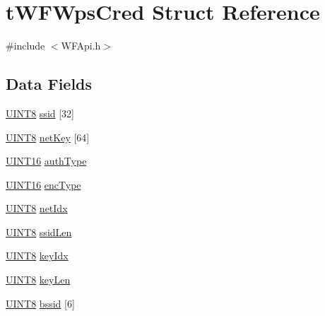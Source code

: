 \hypertarget{structt_w_f_wps_cred}{}\section{t\+W\+F\+Wps\+Cred Struct Reference}
\label{structt_w_f_wps_cred}


{\ttfamily \#include $<$W\+F\+Api.\+h$>$}

\subsection*{Data Fields}
\begin{DoxyCompactItemize}
\item 
\hyperlink{_generic_type_defs_8h_ab27e9918b538ce9d8ca692479b375b6a}{U\+I\+N\+T8} \hyperlink{structt_w_f_wps_cred_ad631765096072d8ec9f442288d4280d0}{ssid} \mbox{[}32\mbox{]}
\item 
\hyperlink{_generic_type_defs_8h_ab27e9918b538ce9d8ca692479b375b6a}{U\+I\+N\+T8} \hyperlink{structt_w_f_wps_cred_a29f2efaae924db63c1099fe81e233374}{net\+Key} \mbox{[}64\mbox{]}
\item 
\hyperlink{_generic_type_defs_8h_acfa284fa8026c4aace2728f7f15d6c13}{U\+I\+N\+T16} \hyperlink{structt_w_f_wps_cred_ae7b1078616e49235da73a474e25781d7}{auth\+Type}
\item 
\hyperlink{_generic_type_defs_8h_acfa284fa8026c4aace2728f7f15d6c13}{U\+I\+N\+T16} \hyperlink{structt_w_f_wps_cred_a5a5b9f2801805bd0ba066a58208e184b}{enc\+Type}
\item 
\hyperlink{_generic_type_defs_8h_ab27e9918b538ce9d8ca692479b375b6a}{U\+I\+N\+T8} \hyperlink{structt_w_f_wps_cred_ab819ac6d3a28ec5cd8f7c63e22dbe4bd}{net\+Idx}
\item 
\hyperlink{_generic_type_defs_8h_ab27e9918b538ce9d8ca692479b375b6a}{U\+I\+N\+T8} \hyperlink{structt_w_f_wps_cred_a2172fc4e4cae6a48b945435288912995}{ssid\+Len}
\item 
\hyperlink{_generic_type_defs_8h_ab27e9918b538ce9d8ca692479b375b6a}{U\+I\+N\+T8} \hyperlink{structt_w_f_wps_cred_ac9a3449850cd1bfbfdd89840686f2313}{key\+Idx}
\item 
\hyperlink{_generic_type_defs_8h_ab27e9918b538ce9d8ca692479b375b6a}{U\+I\+N\+T8} \hyperlink{structt_w_f_wps_cred_a19c67de3f96782516f1c496a77e01074}{key\+Len}
\item 
\hyperlink{_generic_type_defs_8h_ab27e9918b538ce9d8ca692479b375b6a}{U\+I\+N\+T8} \hyperlink{structt_w_f_wps_cred_af1eb240ad4299a104d0bf3fddcabbb95}{bssid} \mbox{[}6\mbox{]}
\end{DoxyCompactItemize}


